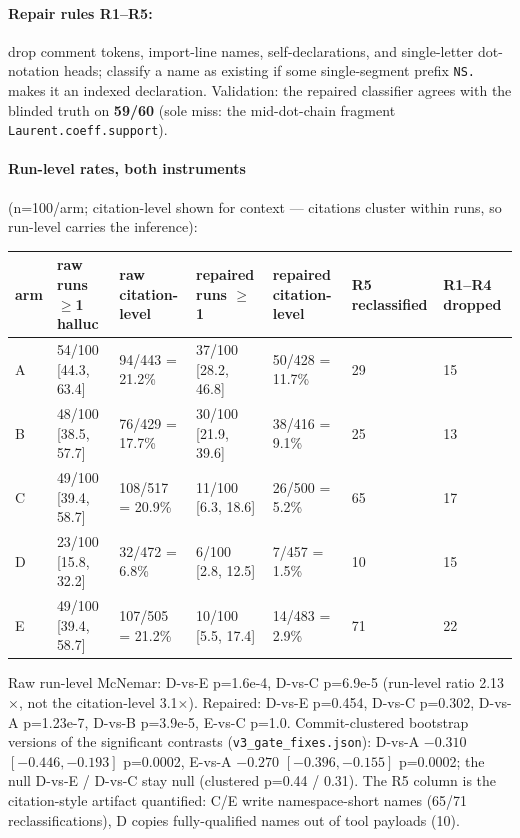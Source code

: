 \documentclass[10pt]{article}
\newcommand{\code}[1]{\texttt{#1}}
\begin{document}
\paragraph{Repair rules R1--R5:} drop comment tokens, import-line
names, self-declarations, and single-letter dot-notation heads;
classify a name as existing if some single-segment prefix \code{NS.}
makes it an indexed declaration. Validation: the repaired classifier
agrees with the blinded truth on \textbf{59/60} (sole miss: the
mid-dot-chain fragment \code{Laurent.coeff.support}).

\paragraph{Run-level rates, both instruments} (n=100/arm;
citation-level shown for context --- citations cluster within runs, so
run-level carries the inference):

\begin{center}\scriptsize
\begin{tabular}{@{}lllllll@{}}
\toprule
arm & raw runs $\geq$1 halluc & raw citation-level & repaired runs $\geq$1 & repaired citation-level & R5 reclassified & R1--R4 dropped \\
\midrule
A & 54/100 [44.3, 63.4] & 94/443 = 21.2\% & 37/100 [28.2, 46.8] & 50/428 = 11.7\% & 29 & 15 \\
B & 48/100 [38.5, 57.7] & 76/429 = 17.7\% & 30/100 [21.9, 39.6] & 38/416 = 9.1\% & 25 & 13 \\
C & 49/100 [39.4, 58.7] & 108/517 = 20.9\% & 11/100 [6.3, 18.6] & 26/500 = 5.2\% & 65 & 17 \\
D & 23/100 [15.8, 32.2] & 32/472 = 6.8\% & 6/100 [2.8, 12.5] & 7/457 = 1.5\% & 10 & 15 \\
E & 49/100 [39.4, 58.7] & 107/505 = 21.2\% & 10/100 [5.5, 17.4] & 14/483 = 2.9\% & 71 & 22 \\
\bottomrule
\end{tabular}
\end{center}

Raw run-level McNemar: D-vs-E p=1.6e-4, D-vs-C p=6.9e-5 (run-level
ratio 2.13$\times$, not the citation-level 3.1$\times$). Repaired:
D-vs-E p=0.454, D-vs-C p=0.302, D-vs-A p=1.23e-7, D-vs-B p=3.9e-5,
E-vs-C p=1.0. Commit-clustered bootstrap versions of the significant
contrasts (\code{v3\_gate\_fixes.json}): D-vs-A $-0.310$
$[-0.446, -0.193]$ p=0.0002, E-vs-A $-0.270$ $[-0.396, -0.155]$
p=0.0002; the null D-vs-E / D-vs-C stay null (clustered p=0.44 /
0.31). The R5 column is the citation-style artifact quantified: C/E
write namespace-short names (65/71 reclassifications), D copies
fully-qualified names out of tool payloads (10).
\end{document}
